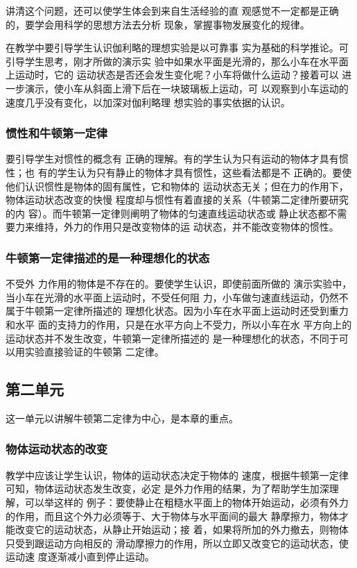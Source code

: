 讲清这个问题，还可以使学生体会到来自生活经验的直
观感觉不一定都是正确的，要学会用科学的思想方法去分析
现象，掌握事物发展变化的规律。

在教学中要引导学生认识伽利略的理想实验是以可靠事
实为基础的科学推论。可引导学生思考，刚才所做的演示实
验中如果水平面是光滑的，那么小车在水平面上运动时，它的
运动状态是否还会发生变化呢？小车将做什么运动？接着可以
进一步演示，使小车从斜面上滑下后在一块玻璃板上运动，可
以观察到小车运动的速度几乎没有变化，以加深对伽利略理
想实验的事实依据的认识。

\subsubsection{惯性和牛顿第一定律}

要引导学生对惯性的概念有
正确的理解。有的学生认为只有运动的物体才具有惯性；也
有的学生认为只有静止的物体才具有惯性，这些看法都是不
正确的。要使他们认识惯性是物体的固有属性，它和物体的
运动状态无关；但在力的作用下，物体运动状态改变的快慢
程度却与惯性有着直接的关系（牛顿第二定律所要研究的内
容）。而牛顿第一定律则阐明了物体的匀速直线运动状态或
静止状态都不需要力来维持，外力的作用只是改变物体的运
动状态，并不能改变物体的惯性。

\subsubsection{牛顿第一定律描述的是一种理想化的状态}

不受外
力作用的物体是不存在的。要使学生认识，即使前面所做的
演示实验中，当小车在光滑的水平面上运动时，不受任何阻
力，小车做匀速直线运动，仍然不属于牛顿第一定律所描述的
理想化状态。因为小车在水平面上运动时还受到重力和水平
面的支持力的作用，只是在水平方向上不受力，所以小车在水
平方向上的运动状态并不发生改变，牛顿第一定律所描述的
是一种理想化的状态，不同于可以用实验直接验证的牛顿第
二定律。

\subsection{第二单元}
这一单元以讲解牛顿第二定律为中心，是本章的重点。
\subsubsection{物体运动状态的改变}
教学中应该让学生认识，物体的运动状态决定于物体的
速度，根据牛顿第一定律可知，物体运动状态发生改变，必定
是外力作用的结果，为了帮助学生加深理解，可以举这样的
例子：要使静止在粗糙水平面上的物体开始运动，必须有外力
的作用，而且这个外力必须等于、大于物体与水平面间的最大
静摩擦力，物体才能改变它的运动状态，从静止开始运动；接
着，如果将所加的外力撤去，则物体只受到跟运动方向相反的
滑动摩擦力的作用，所以立即又改变它的运动状态，使运动速
度逐渐减小直到停止运动。


